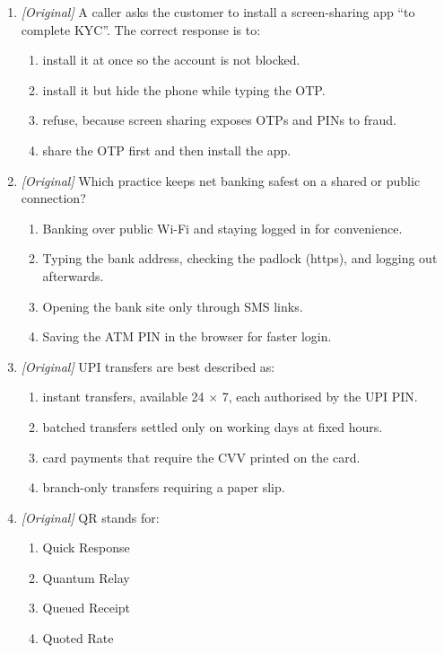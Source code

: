 \documentclass[11pt]{article}
\begin{document}
\begin{enumerate}[label=\textbf{Q\arabic*.}, leftmargin=*]
  channel?
  \begin{enumerate}[label=\Alph*.]
    \item ATM PIN --- authorises UPI payments in the phone app.
    \item UPI PIN --- authorises a UPI payment on the phone.
    \item CVV --- arrives by SMS and expires after one use.
    \item OTP --- printed on the card and reused for years.
  \end{enumerate}
\item \textit{[Original]} A caller asks the customer to install a
  screen-sharing app ``to complete KYC''. The correct response is to:
  \begin{enumerate}[label=\Alph*.]
    \item install it at once so the account is not blocked.
    \item install it but hide the phone while typing the OTP.
    \item refuse, because screen sharing exposes OTPs and PINs to fraud.
    \item share the OTP first and then install the app.
  \end{enumerate}
\item \textit{[Original]} Which practice keeps net banking safest on a
  shared or public connection?
  \begin{enumerate}[label=\Alph*.]
    \item Banking over public Wi-Fi and staying logged in for convenience.
    \item Typing the bank address, checking the padlock (https), and logging
      out afterwards.
    \item Opening the bank site only through SMS links.
    \item Saving the ATM PIN in the browser for faster login.
  \end{enumerate}
\item \textit{[Original]} UPI transfers are best described as:
  \begin{enumerate}[label=\Alph*.]
    \item instant transfers, available 24 $\times$ 7, each authorised by the
      UPI PIN.
    \item batched transfers settled only on working days at fixed hours.
    \item card payments that require the CVV printed on the card.
    \item branch-only transfers requiring a paper slip.
  \end{enumerate}
\item \textit{[Original]} QR stands for:
  \begin{enumerate}[label=\Alph*.]
    \item Quick Response
    \item Quantum Relay
    \item Queued Receipt
    \item Quoted Rate
  \end{enumerate}


\end{enumerate}
\end{document}
